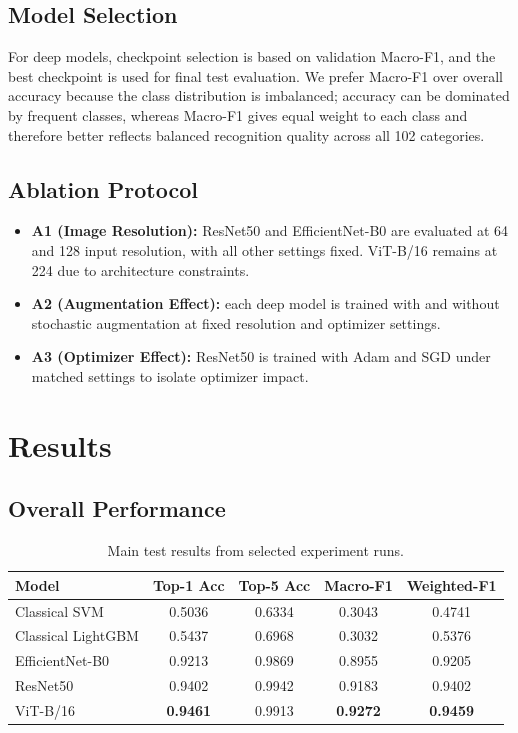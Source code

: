 \documentclass[11pt]{article}
\begin{document}
\subsection{Model Selection}
For deep models, checkpoint selection is based on validation Macro-F1, and the best checkpoint is used for final test evaluation. We prefer Macro-F1 over overall accuracy because the class distribution is imbalanced; accuracy can be dominated by frequent classes, whereas Macro-F1 gives equal weight to each class and therefore better reflects balanced recognition quality across all 102 categories.

\subsection{Ablation Protocol}
\begin{itemize}
    \item \textbf{A1 (Image Resolution):} ResNet50 and EfficientNet-B0 are evaluated at 64 and 128 input resolution, with all other settings fixed. ViT-B/16 remains at 224 due to architecture constraints.
    \item \textbf{A2 (Augmentation Effect):} each deep model is trained with and without stochastic augmentation at fixed resolution and optimizer settings.
    \item \textbf{A3 (Optimizer Effect):} ResNet50 is trained with Adam and SGD under matched settings to isolate optimizer impact.
\end{itemize}

\section{Results}
\subsection{Overall Performance}
\begin{table}[H]
\centering
\caption{Main test results from selected experiment runs.}
\begin{tabular}{lcccc}
\toprule
Model & Top-1 Acc & Top-5 Acc & Macro-F1 & Weighted-F1 \\
\midrule
Classical SVM & 0.5036 & 0.6334 & 0.3043 & 0.4741 \\
Classical LightGBM & 0.5437 & 0.6968 & 0.3032 & 0.5376 \\
EfficientNet-B0 & 0.9213 & 0.9869 & 0.8955 & 0.9205 \\
ResNet50 & 0.9402 & 0.9942 & 0.9183 & 0.9402 \\
ViT-B/16 & \textbf{0.9461} & 0.9913 & \textbf{0.9272} & \textbf{0.9459} \\
\bottomrule
\end{tabular}
\end{table}
\end{document}
